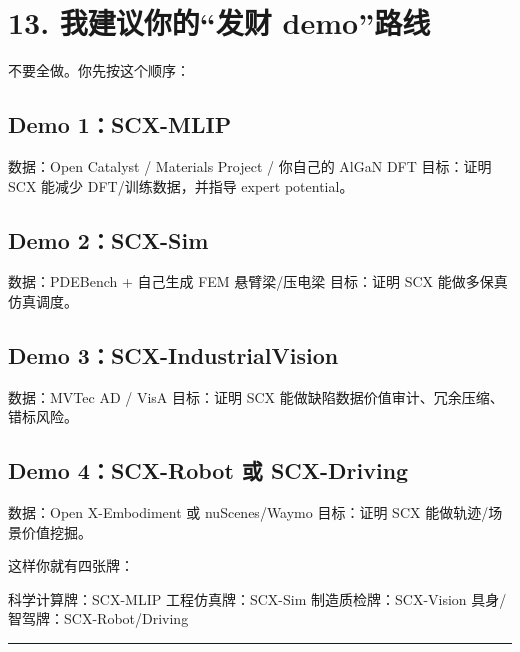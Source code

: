 \documentclass[
  12pt,
]{ctexart}
\newenvironment{Shaded}{}{}
\newcommand{\NormalTok}[1]{#1}
\begin{document}
\section{13. 我建议你的``发财
demo''路线}\label{ux6211ux5efaux8baeux4f60ux7684ux53d1ux8d22-demoux8defux7ebf}

不要全做。你先按这个顺序：

\subsection{Demo 1：SCX-MLIP}\label{demo-1scx-mlip}

数据：Open Catalyst / Materials Project / 你自己的 AlGaN DFT 目标：证明
SCX 能减少 DFT/训练数据，并指导 expert potential。

\subsection{Demo 2：SCX-Sim}\label{demo-2scx-sim}

数据：PDEBench + 自己生成 FEM 悬臂梁/压电梁 目标：证明 SCX
能做多保真仿真调度。

\subsection{Demo
3：SCX-IndustrialVision}\label{demo-3scx-industrialvision}

数据：MVTec AD / VisA 目标：证明 SCX
能做缺陷数据价值审计、冗余压缩、错标风险。

\subsection{Demo 4：SCX-Robot 或
SCX-Driving}\label{demo-4scx-robot-ux6216-scx-driving}

数据：Open X-Embodiment 或 nuScenes/Waymo 目标：证明 SCX
能做轨迹/场景价值挖掘。

这样你就有四张牌：

\begin{Shaded}
\begin{Highlighting}[]
\NormalTok{科学计算牌：SCX{-}MLIP}
\NormalTok{工程仿真牌：SCX{-}Sim}
\NormalTok{制造质检牌：SCX{-}Vision}
\NormalTok{具身/智驾牌：SCX{-}Robot/Driving}
\end{Highlighting}
\end{Shaded}

\begin{center}\rule{0.5\linewidth}{0.5pt}\end{center}
\end{document}
